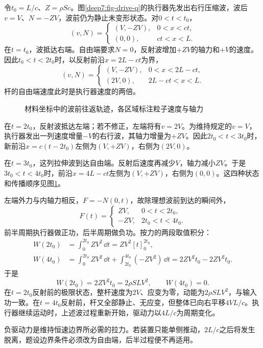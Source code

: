 \begin{solution}
令$t_0=L/c$、$Z=\rho Sc$。图\ref{deep7:fig-drive-q}的执行器先发出右行压缩波，波后$v=V$、$N=-ZV$，波前仍为静止未变形状态。对$0<t<t_0$，
\[
 (v,N)=\begin{cases}(V,-ZV),&0<x<ct,\\(0,0),&ct<x<L.\end{cases}
\]
在$t=t_0$，波抵达右端。自由端要求$N=0$，反射波增加$+ZV$的轴力和$+V$的速度。因此$t_0<t<2t_0$时，以反射前沿$x=2L-ct$为界，
\[
 (v,N)=\begin{cases}(V,-ZV),&0<x<2L-ct,\\(2V,0),&2L-ct<x<L.\end{cases}
\]
杆的自由端速度此时是执行器速度的两倍。
\begin{figure}[H]\centering
{}
\caption{材料坐标中的波前往返轨迹，各区域标注粒子速度与轴力}\label{deep7:fig-drive-s}
\end{figure}
在$t=2t_0$，反射波抵达左端；若不修正，左端将有$v=2V$。为维持规定的$v=V$，执行器发出一列速度增量$-V$的右行波，其轴力增量为$+ZV$。因此$2t_0<t<3t_0$时，新前沿$x=c(t-2t_0)$左侧为$(V,+ZV)$，右侧为$(2V,0)$。

在$t=3t_0$，这列拉伸波到达自由端。反射后速度再减少$V$，轴力减小$ZV$。于是$3t_0<t<4t_0$时，前沿$x=4L-ct$左侧为$(V,+ZV)$，右侧为$(0,0)$。这四种状态和传播顺序见图\ref{deep7:fig-drive-s}。

左端外力与内轴力相反，$F=-N(0,t)$，故除理想波前到达的瞬间外，
\[
 F(t)=\begin{cases}ZV,&0<t<2t_0,\\-ZV,&2t_0<t<4t_0.\end{cases}
\]
前半周期执行器做正功，后半周期做负功。按力的两段取值积分：
\[
\begin{aligned}
W(2t_0)&=\int_0^{2t_0}ZV^2\,\dd t=ZV^2[t]_0^{2t_0},\\
W(4t_0)&=\int_0^{2t_0}ZV^2\,\dd t+\int_{2t_0}^{4t_0}(-ZV^2)\,\dd t
=2ZV^2t_0-2ZV^2t_0.
\end{aligned}
\]
于是
\[
 W(2t_0)=2ZV^2t_0=2\rho SLV^2,
 \qquad W(4t_0)=0.
\]
在$t=2t_0$反射前的极限状态，整杆速度为$2V$、应变为零，动能为$2\rho SLV^2$，与输入功一致。在$t=4t_0$反射前，杆又全部静止、无应变，但整体已向右平移$4VL/c$。执行器继续运动时，上述波过程重新开始，驱动力以$4L/c$为周期变化。

负驱动力是维持恒速边界所必需的拉力。若装置只能单侧推动，$2L/c$之后将发生脱离，题设边界条件必须改为自由端，后半过程便不再适用。
\end{solution}



